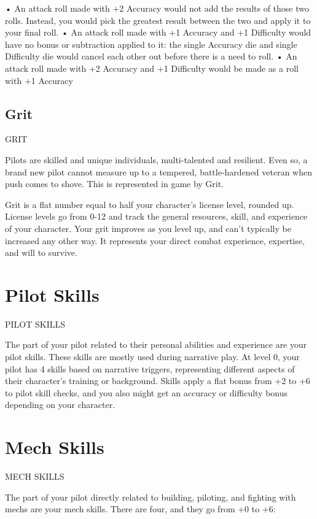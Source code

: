       •  An attack roll made with +2 Accuracy would not add the results of those two rolls.
          Instead, you would pick the greatest result between the two and apply it to your final roll.
       •  An attack roll made with +1 Accuracy and +1 Difficulty would have no bonus or
         subtraction applied to it: the single Accuracy die and single Difficulty die would cancel
          each other out before there is a need to roll.
       •  An attack roll made with +2 Accuracy and +1 Difficulty would be made as a roll with +1
         Accuracy

\section{Grit}
                                                      GRIT

Pilots are skilled and unique individuals, multi-talented and resilient. Even so, a brand new pilot
cannot measure up to a tempered, battle-hardened veteran when push comes to shove. This is
represented in game by Grit.

Grit is a flat number equal to half your character’s license level, rounded up. License levels go
from 0-12 and track the general resources, skill, and experience of your character. Your grit
improves as you level up, and can’t typically be increased any other way. It represents your direct
combat experience, expertise, and will to survive.

\chapter{Pilot Skills}
                                              PILOT SKILLS

The part of your pilot related to their personal abilities and experience are your pilot skills. These
skills are mostly used during narrative play. At level 0, your pilot has 4 skills based on narrative
triggers, representing different aspects of their character’s training or background. Skills apply a
flat bonus from +2 to +6 to pilot skill checks, and you also might get an accuracy or difficulty
bonus depending on your character.

\chapter{Mech Skills}
                                              MECH SKILLS

The part of your pilot directly related to building, piloting, and fighting with mechs are your mech
skills. There are four, and they go from +0 to +6:

